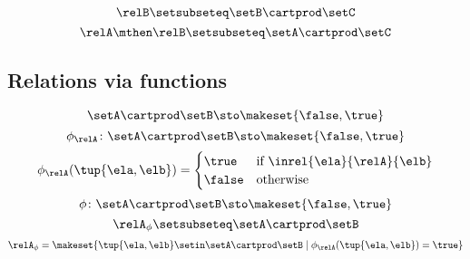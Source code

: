 \begin{forslides}
    \begin{equation}
        \label{eq:slides_session2_rel_108}
        \relB \setsubseteq \setB \cartprod \setC
    \end{equation}
    \begin{equation}
        \label{eq:slides_session2_rel_109}
        \relA \mthen \relB \setsubseteq \setA \cartprod \setC
    \end{equation}

    \subsection{Relations via functions}

    \begin{equation}
        \label{eq:slides_session2_rel_110}
        \setA \cartprod \setB \sto \makeset{ \false, \true }
    \end{equation}
    \begin{equation}
        \label{eq:slides_session2_rel_111}
        \phi_{\relA} \colon \setA \cartprod \setB \sto \makeset{ \false, \true }
    \end{equation}
    \begin{equation}
        \label{eq:slides_session2_rel_112}
        \phi_{\relA}(\tup{\ela, \elb}) =
        \begin{cases}
            \true  & \text{if } \inrel{\ela}{\relA}{\elb} \\
            \false & \text{otherwise}
        \end{cases}
    \end{equation}
    \begin{equation}
        \label{eq:slides_session2_rel_113}
        \phi\colon \setA \cartprod \setB \sto \makeset{ \false, \true }
    \end{equation}
    \begin{equation}
        \label{eq:slides_session2_rel_114}
        \relA_{\phi} \setsubseteq \setA \cartprod \setB
    \end{equation}
    \begin{equation}
        \label{eq:slides_session2_rel_115}
        \relA_{\phi} = \makeset{ \tup{\ela, \elb} \setin \setA \cartprod \setB \mid \phi_{\relA}(\tup{\ela, \elb}) = \true }
    \end{equation}
    \begin{equation}
        \label{eq:slides_session2_rel_116}

\end{equation}
\end{forslides}
